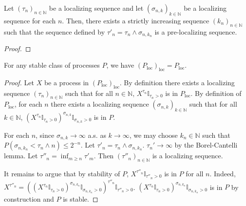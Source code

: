 \begin{lemma}\label{lem:isPreLocalizingSequence_of_isLocalizingSequence}
  \leanok
Let $(\tau_n)_{n \in \mathbb{N}}$ be a localizing sequence and let $(\sigma_{n,k})_{k \in \mathbb{N}}$ be a localizing sequence for each $n$.
Then, there exists a strictly increasing sequence $(k_n)_{n \in \mathbb{N}}$ such that the sequence defined by $\tau'_n = \tau_n \wedge \sigma_{n,k_n}$ is a pre-localizing sequence.
\end{lemma}

\begin{proof}

\end{proof}


\begin{lemma}\label{lem:locally_locally}
  \leanok
For any stable class of processes $P$, we have $(P_{\mathrm{loc}})_{\mathrm{loc}} = P_{\mathrm{loc}}$.
\end{lemma}

\begin{proof}\leanok
Let $X$ be a process in $(P_{\mathrm{loc}})_{\mathrm{loc}}$.
By definition there exists a localizing sequence $(\tau_n)_{n \in \mathbb{N}}$ such that for all $n \in \mathbb{N}$, $X^{\tau_n}\mathbb{I}_{\tau_n > 0}$ is in $P_{\mathrm{loc}}$.
By definition of $P_{\mathrm{loc}}$, for each $n$ there exists a localizing sequence $(\sigma_{n,k})_{k \in \mathbb{N}}$ such that for all $k \in \mathbb{N}$, $(X^{\tau_n}\mathbb{I}_{\tau_n > 0})^{\sigma_{n,k}}\mathbb{I}_{\sigma_{n,k} > 0}$ is in $P$.

For each $n$, since $\sigma_{n,k} \to \infty$ a.s. as $k \to \infty$, we may choose $k_n \in \mathbb{N}$ such that $P(\sigma_{n,k_n} < \tau_n \wedge n) \le 2^{-n}$.
Let $\tau'_n = \tau_n \wedge \sigma_{n,k_n}$. $\tau_n' \to \infty$ by the Borel-Cantelli lemma.
Let $\tau''_n = \inf_{m \ge n} \tau'_m$.
Then $(\tau''_n)_{n \in \mathbb{N}}$ is a localizing sequence.

It remains to argue that by stability of $P$, $X^{\tau''_n}\mathbb{I}_{\tau''_n > 0}$ is in $P$ for all $n$.
Indeed, $X^{\tau''_n} = ((X^{\tau_n}\mathbb{I}_{\tau_n > 0})^{\sigma_{n,k_n}}\mathbb{I}_{\sigma_{n,k_n} > 0})^{\tau''_n}\mathbb{I}_{\tau''_n > 0}$. $(X^{\tau_n}\mathbb{I}_{\tau_n > 0})^{\sigma_{n,k_n}}\mathbb{I}_{\sigma_{n,k_n} > 0}$ is in $P$ by construction and $P$ is stable.
\end{proof}


